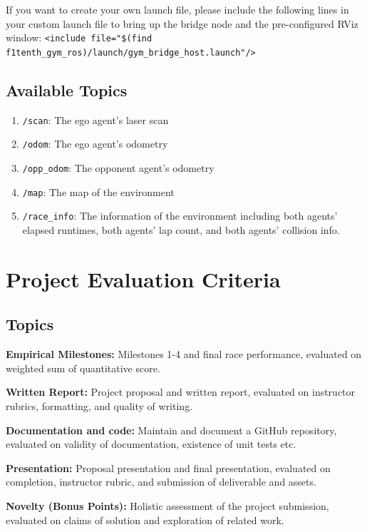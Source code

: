 \documentclass[letta4 paper]{article}
\numberwithin{equation}{section}
\newcommand{\0}{\mathbf{0}}
\begin{document}
	If you want to create your own launch file, please include the following lines in your custom launch file to bring up the bridge node and the pre-configured RViz window: \texttt{<include file="\$(find f1tenth\_gym\_ros)/launch/gym\_bridge\_host.launch"/>}

	\subsection{Available Topics}
	\begin{enumerate}
		\item \texttt{/scan}: The ego agent's laser scan
		\item \texttt{/odom}: The ego agent's odometry
		\item \texttt{/opp\_odom}: The opponent agent's odometry
		\item \texttt{/map}: The map of the environment
		\item \texttt{/race\_info}: The information of the environment including both agents' elapsed runtimes, both agents' lap count, and both agents' collision info.
	\end{enumerate}

	\section{Project Evaluation Criteria}
	\subsection{Topics}
	\textbf{Empirical Milestones:} Milestones 1-4 and final race performance, evaluated on weighted sum of quantitative score.
	
	\noindent\textbf{Written Report:} Project proposal and written report, evaluated on instructor rubrics, formatting, and quality of writing.
	
	\noindent\textbf{Documentation and code:} Maintain and document a GitHub repository, evaluated on validity of documentation, existence of unit tests etc.
	
	\noindent\textbf{Presentation:} Proposal presentation and final presentation, evaluated on completion, instructor rubric, and submission of deliverable and assets.
	
	\noindent\textbf{Novelty (Bonus Points):} Holistic assessment of the project submission, evaluated on claims of solution and exploration of related work.
\end{document}
